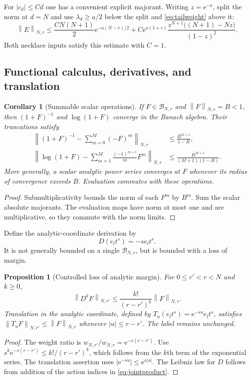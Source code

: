 \documentclass[11pt,a4paper]{article}
\numberwithin{equation}{section}
\newtheorem{proposition}[theorem]{Proposition}
\newtheorem{corollary}[theorem]{Corollary}
\theoremstyle{definition}
\theoremstyle{remark}
\newcommand{\B}{\mathcal B}
\newcommand{\ee}{\mathrm e}
\newcommand{\norm}[1]{\left\|#1\right\|}
\begin{document}
For $|c_d|\le Cd$ one has a convenient explicit majorant. Writing
$z=\ee^{-a}$, split the norm at $d=N$ and use
$\lambda_d\ge a/2$ below the split and \eqref{eq:tailweight} above it:
\begin{equation}
 \norm{E}_{N,r}\le
 \frac{CN(N+1)}2\ee^{-a(N-r)/2}
 +C\ee^{a(1+r)}
 \frac{z^{N+1}\bigl((N+1)-Nz\bigr)}{(1-z)^2}.
 \label{eq:explicitnorm}
\end{equation}
Both necklace inputs satisfy this estimate with $C=1$.

\subsection{Functional calculus, derivatives, and translation}

\begin{corollary}[Summable scalar operations]\label{cor:funcalc}
If $F\in\B_{N,r}$ and $\norm{F}_{N,r}=B<1$, then
$(1+F)^{-1}$ and $\log(1+F)$ converge in the Banach algebra. Their
truncations satisfy
\begin{align}
 \norm{(1+F)^{-1}-\sum_{m=0}^M(-F)^m}_{N,r}
 &\le\frac{B^{M+1}}{1-B},\label{eq:invbound}\\
 \norm{\log(1+F)-\sum_{m=1}^M\frac{(-1)^{m+1}}mF^m}_{N,r}
 &\le\frac{B^{M+1}}{(M+1)(1-B)}.\label{eq:logbound}
\end{align}
More generally, a scalar analytic power series converges at $F$ whenever
its radius of convergence exceeds $B$. Evaluation commutes with these
operations.
\end{corollary}
\begin{proof}
Submultiplicativity bounds the norm of each $F^m$ by $B^m$. Sum the
scalar absolute majorants. The evaluation maps have norm at most one
and are multiplicative, so they commute with the norm limits.
\end{proof}

Define the analytic-coordinate derivation by
\begin{equation}
 D(e_lt^s)=-s e_lt^s.
 \label{eq:D}
\end{equation}
It is not generally bounded on a single $\B_{N,r}$, but is bounded
with a loss of margin.

\begin{proposition}[Controlled loss of analytic margin]\label{prop:loss}
For $0\le r'<r<N$ and $k\ge0$,
\begin{equation}
 \norm{D^kF}_{N,r'}\le\frac{k!}{(r-r')^k}\norm{F}_{N,r}.
 \label{eq:loss}
\end{equation}
Translation in the analytic coordinate, defined by
$T_u(e_lt^s)=\ee^{-su}e_lt^s$, satisfies
$\norm{T_uF}_{N,r'}\le\norm{F}_{N,r}$ whenever
$|u|\le r-r'$. The label remains unchanged.
\end{proposition}
\begin{proof}
The weight ratio is $w_{N,r'}/w_{N,r}=\ee^{-s(r-r')}$.
Use $s^k\ee^{-s(r-r')}\le k!/(r-r')^k$, which follows from the
$k$th term of the exponential series. The translation assertion uses
$|\ee^{-su}|\le\ee^{s|u|}$. The Leibniz law for $D$ follows from
addition of the action indices in \eqref{eq:jointproduct}.
\end{proof}
\end{document}
